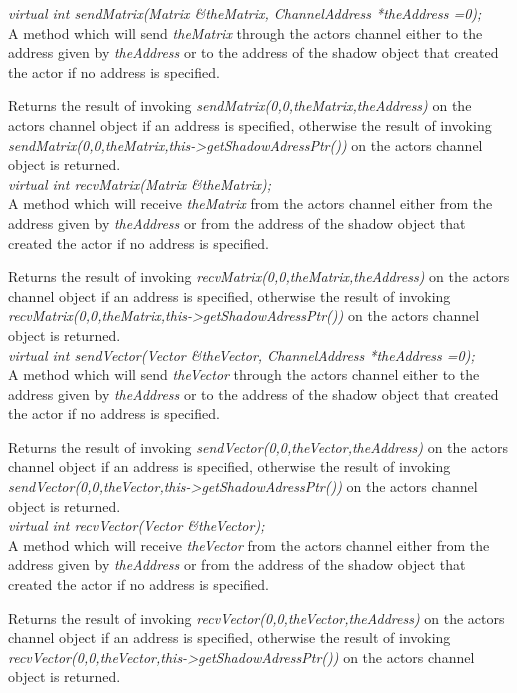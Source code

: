 {\em virtual int sendMatrix(Matrix \&theMatrix, ChannelAddress
*theAddress =0);}\\
A method which will send {\em theMatrix} 
through the actors channel either to the address given by {\em
theAddress} or to the address of the shadow object that created the
actor if no address is specified.

Returns the result of invoking {\em sendMatrix(0,0,theMatrix,theAddress)} on
the actors channel object if an address is specified, otherwise
the result of invoking {\em
sendMatrix(0,0,theMatrix,this->getShadowAdressPtr())} on the actors channel
object is returned. \\ 


{\em virtual int recvMatrix(Matrix \&theMatrix);} \\
A method which will receive {\em theMatrix} from
the actors channel either from the address given by {\em
theAddress} or from the address of the shadow object that created the
actor if no address is specified.

Returns the result of invoking {\em recvMatrix(0,0,theMatrix,theAddress)} on
the actors channel object if an address is specified, otherwise
the result of invoking {\em
recvMatrix(0,0,theMatrix,this->getShadowAdressPtr())} on the actors channel
object is returned. \\ 

{\em virtual int sendVector(Vector \&theVector, ChannelAddress
*theAddress =0);}\\
A method which will send {\em theVector} 
through the actors channel either to the address given by {\em
theAddress} or to the address of the shadow object that created the
actor if no address is specified.

Returns the result of invoking {\em sendVector(0,0,theVector,theAddress)} on
the actors channel object if an address is specified, otherwise
the result of invoking {\em
sendVector(0,0,theVector,this->getShadowAdressPtr())} on the actors channel
object is returned. \\ 


{\em virtual int recvVector(Vector \&theVector);} \\
A method which will receive {\em theVector} from
the actors channel either from the address given by {\em
theAddress} or from the address of the shadow object that created the
actor if no address is specified.

Returns the result of invoking {\em recvVector(0,0,theVector,theAddress)} on
the actors channel object if an address is specified, otherwise
the result of invoking {\em
recvVector(0,0,theVector,this->getShadowAdressPtr())} on the actors channel
object is returned. \\ 


